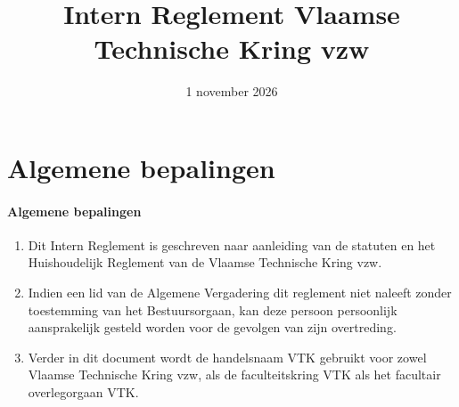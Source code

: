 


\def\labelsection{Afdeling}





\title{Intern Reglement Vlaamse Technische Kring vzw}
\date{1 november 2026}

\maketitle


\part{Algemene bepalingen}

    \subsection{Algemene bepalingen}\label{art:algemene-bepalingen}
    \begin{enumerate}
    \item Dit Intern Reglement is geschreven naar aanleiding van de statuten en het Huishoudelijk Reglement van de Vlaamse Technische Kring vzw.
    \item Indien een lid van de Algemene Vergadering dit reglement niet naleeft zonder toestemming van het Bestuursorgaan, kan deze persoon persoonlijk aansprakelijk gesteld worden voor de gevolgen van zijn overtreding.
    \item Verder in dit document wordt de handelsnaam VTK gebruikt voor zowel Vlaamse Technische Kring vzw, als de faculteitskring VTK als het facultair overlegorgaan VTK.
    \end{enumerate}

